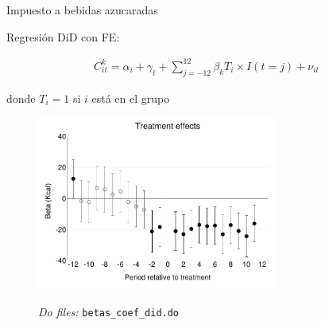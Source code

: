 \documentclass[8pt]{beamer}
\begin{document}
\begin{frame}[label=did]{Impuesto a bebidas azucaradas}

Regresión DiD con FE: 

\begin{align*}
    C_{it}^{k} = \alpha_i+\gamma_t+\sum_{j=-12}^{12}\beta_k T_i\times I(t=j)+\nu_{it}
\end{align*}

donde $T_i=1$ si $i$ está en el grupo  \hyperlink{exposed_group}{}

    \begin{figure}[H]
    \begin{center}
        \includegraphics[width=0.7\textwidth]{Figuras/betas_did_sd_kcal_2_1.pdf}
        \end{center}
    {\footnotesize \textit{Do files: } \texttt{betas\_coef\_did.do}}    
          
\end{figure}

\end{frame}
\end{document}
